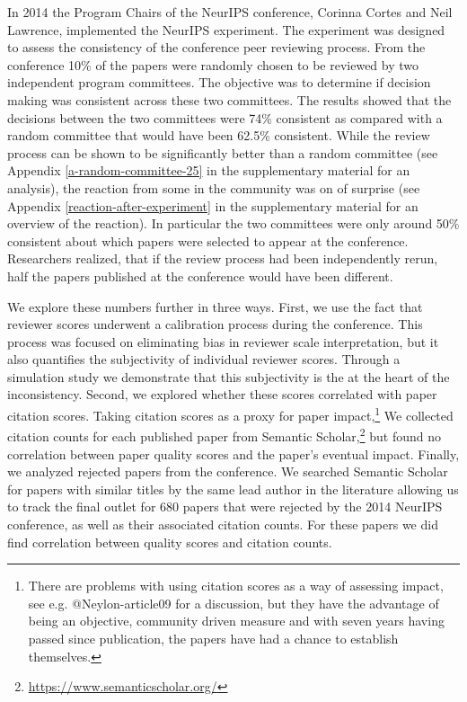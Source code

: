 \documentclass[twoside]{article}
\begin{document}
In 2014 the Program Chairs of the NeurIPS conference, Corinna Cortes and
Neil Lawrence, implemented the NeurIPS experiment. The experiment was
designed to assess the consistency of the conference peer reviewing
process. From the conference 10\% of the papers were randomly chosen to
be reviewed by two independent program committees. The objective was to
determine if decision making was consistent across these two committees.
The results showed that the decisions between the two committees were
74\% consistent as compared with a random committee that would have been
62.5\% consistent. While the review process can be shown to be
significantly better than a random committee (see Appendix \ref{a-random-committee-25} in the
supplementary material for an analysis), the reaction from some in the
community was on of surprise (see Appendix \ref{reaction-after-experiment} in the supplementary
material for an overview of the reaction). In particular the two
committees were only around 50\% consistent about which papers were
selected to appear at the conference. Researchers realized, that if the
review process had been independently rerun, half the papers published
at the conference would have been different.

We explore these numbers further in three ways. First, we use the fact
that reviewer scores underwent a calibration process during the
conference. This process was focused on eliminating bias in reviewer
scale interpretation, but it also quantifies the subjectivity of
individual reviewer scores. Through a simulation study we demonstrate
that this subjectivity is the at the heart of the inconsistency. Second,
we explored whether these scores correlated with paper citation scores.
Taking citation scores as a proxy for paper impact,\footnote{There are
  problems with using citation scores as a way of assessing impact, see
  e.g. @Neylon-article09 for a discussion, but they have the advantage
  of being an objective, community driven measure and with seven years
  having passed since publication, the papers have had a chance to
  establish themselves.} We collected citation counts for each published
paper from Semantic Scholar,\footnote{\url{https://www.semanticscholar.org/}}
but found no correlation between paper quality scores and the paper's
eventual impact. Finally, we analyzed rejected papers from the
conference. We searched Semantic Scholar for papers with similar titles
by the same lead author in the literature allowing us to track the final
outlet for 680 papers that were rejected by the 2014 NeurIPS conference,
as well as their associated citation counts. For these papers we did
find correlation between quality scores and citation counts.
\end{document}
